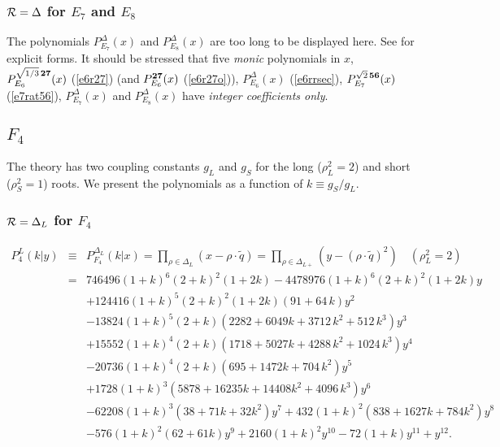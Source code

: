 \documentclass[a4paper,12pt]{article}
\begin{document}
\subsubsection{${\cal R}={\Delta}$ for $E_7$ and $E_8$}

The polynomials $P_{E_7}^{\Delta}(x)$ and $P_{E_8}^{\Delta}(x)$ are too
long to be displayed here. See \cite{poly} for explicit forms.
It should be stressed that five {\em monic\/} polynomials in $x$,
$P_{E_6}^{\sqrt{1/3}\,{\bf 27}}(x)$ (\ref{e6r27}) (and $P_{E_6}^{\bf 27}(x)$
(\ref{e6r27o})), $P_{E_6}^{\Delta}(x)$ (\ref{e6rrsec}),
$P_{E_7}^{\sqrt{2}\,\bf 56}(x)$ (\ref{e7rat56}), $P_{E_7}^{\Delta}(x)$ and
$P_{E_8}^{\Delta}(x)$ have {\em integer coefficients only\/}.

\subsection{$F_4$}

The theory has two coupling constants $g_L$ and $g_S$ for the long
($\rho_L^2=2$) and short ($\rho_S^2=1$) roots.
We present the polynomials as a function of $k\equiv g_S/g_L$.

\subsubsection{${\cal R}=\Delta_L$ for $F_4$}

\begin{eqnarray}
   P_4^L(k|y)&\!\!\equiv\!\!&P_{F_4}^{\Delta_L}(k|x)=
   \prod_{\rho\in{\Delta_{L}}}\left(x-\rho\cdot\tilde{q}\right)
   =\prod_{\rho\in{\Delta_{L+}}}\left(y-(\rho\cdot\tilde{q})^2\right)
   \quad (\rho_L^2=2) \nonumber\\
%
   &\!\!=\!\!&746496(1 + k)^6(2 + k)^2(1 + 2k) -
   4478976(1 + k)^6(2 + k)^2(1 + 2k)y\nonumber\\
   && + 124416(1 + k)^5(2 + k)^2(1 + 2k)(91 + 64\,k)y^2\nonumber\\
   && -
   13824(1 + k)^5(2 + k)\left(2282 + 6049k + 3712\,k^2 + 512\,k^3\right)y^3
   \nonumber\\
   && +
   15552(1 + k)^4(2 + k)\left(1718 + 5027k + 4288\,k^2 + 1024\,k^3\right)y^4
   \nonumber\\
   && -
   20736(1 + k)^4(2 + k)\left(695 + 1472k + 704\,k^2\right)y^5\nonumber\\
   && +
   1728(1 + k)^3\left(5878 + 16235k + 14408k^2 + 4096\,k^3\right)y^6
   \nonumber\\
   && - 62208(1 + k)^3(38 + 71k + 32k^2)y^7 +
   432(1 + k)^2(838 + 1627k + 784k^2)y^8\nonumber\\
   && - 576(1 + k)^2(62 + 61k)y^9 + 2160(1 + k)^2y^{10} - 72(1 + k)y^{11}
   + y^{12}.
   \label{f4r24l}
\end{eqnarray}
\end{document}
